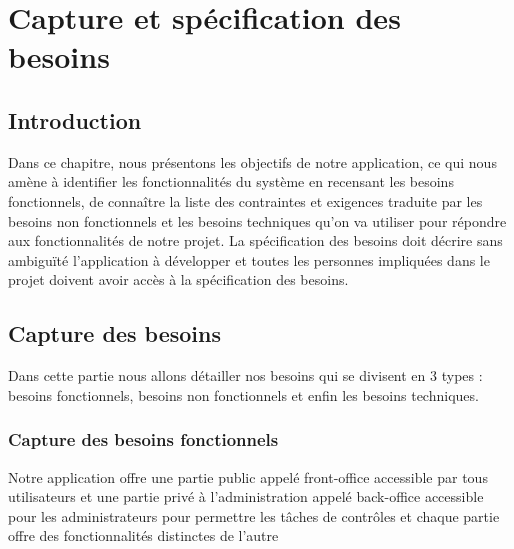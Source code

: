 \documentclass[11pt,a4paper,oneside]{book}
\begin{document}
	
	\chapter{Capture et spécification des besoins}
	\section{Introduction}	
	Dans ce chapitre, nous présentons les objectifs de notre application, ce qui nous amène à identifier les fonctionnalités du système en recensant les besoins fonctionnels, de connaître la liste des contraintes et exigences traduite par les besoins non fonctionnels et les besoins techniques qu’on va utiliser pour répondre aux fonctionnalités de notre projet.
	La spécification des besoins doit décrire sans ambiguïté l’application à développer et toutes les personnes impliquées dans le projet doivent avoir accès à la spécification des besoins.
	
	\section{Capture des besoins}
	Dans cette partie nous allons détailler nos besoins qui se divisent en 3 types : besoins fonctionnels, besoins non fonctionnels et enfin les besoins techniques.
	\subsection{Capture des besoins fonctionnels}
	Notre application offre une partie public appelé front-office accessible par tous utilisateurs et une partie privé à l’administration appelé back-office accessible pour les administrateurs pour permettre les tâches de contrôles et chaque partie offre des fonctionnalités distinctes de l’autre 	
\end{document}
